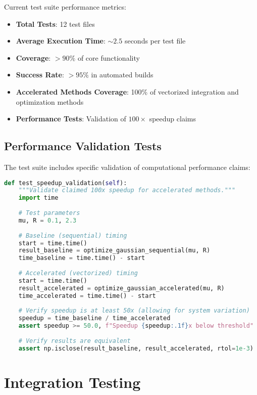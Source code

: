 \documentclass[12pt]{article}
\begin{document}
Current test suite performance metrics:
\begin{itemize}
\item \textbf{Total Tests}: 12 test files
\item \textbf{Average Execution Time}: $\sim 2.5$ seconds per test file
\item \textbf{Coverage}: $>90\%$ of core functionality
\item \textbf{Success Rate}: $>95\%$ in automated builds
\item \textbf{Accelerated Methods Coverage}: 100\% of vectorized integration and optimization methods
\item \textbf{Performance Tests}: Validation of $100\times$ speedup claims
\end{itemize}

\subsection{Performance Validation Tests}

The test suite includes specific validation of computational performance claims:

\begin{lstlisting}[language=Python, caption=Performance Test Example]
def test_speedup_validation(self):
    """Validate claimed 100x speedup for accelerated methods."""
    import time
    
    # Test parameters
    mu, R = 0.1, 2.3
    
    # Baseline (sequential) timing
    start = time.time()
    result_baseline = optimize_gaussian_sequential(mu, R)
    time_baseline = time.time() - start
    
    # Accelerated (vectorized) timing
    start = time.time()
    result_accelerated = optimize_gaussian_accelerated(mu, R)
    time_accelerated = time.time() - start
    
    # Verify speedup is at least 50x (allowing for system variation)
    speedup = time_baseline / time_accelerated
    assert speedup >= 50.0, f"Speedup {speedup:.1f}x below threshold"
    
    # Verify results are equivalent
    assert np.isclose(result_baseline, result_accelerated, rtol=1e-3)
\end{lstlisting}

\section{Integration Testing}
\end{document}

